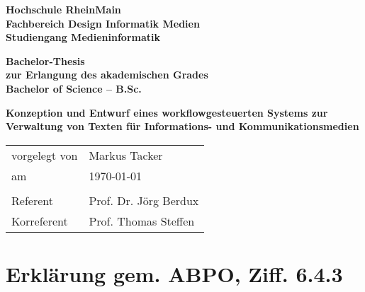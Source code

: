 \documentclass[11pt,a4paper]{article}
\begin{document}
\setmainfont[Mapping=tex-text]{ITC Stone Sans Std}


\setlength\fboxsep{0pt}
\setlength\fboxrule{0.5pt}




\begin{center}

\begin{small}

\textbf{Hochschule RheinMain\\Fachbereich Design Informatik Medien\\Studiengang Medieninformatik}

\vspace{1cm}

\textbf{Bachelor-Thesis\\zur Erlangung des akademischen Grades\\Bachelor of Science – B.Sc.}

\end{small}

\vspace{2cm}

\begin{huge}

\textbf{Konzeption und Entwurf eines workflowgesteuerten Systems zur Verwaltung von Texten für Informations- und Kommunikationsmedien}

\end{huge}

\end{center}

\setmainfont[Mapping=tex-text,BoldFont={Vollkorn-Bold},ItalicFont={Vollkorn-Italic},BoldItalicFont={Vollkorn-Bold Italic}]{Vollkorn}
\setsansfont[Mapping=tex-text]{ITC Stone Sans Std}

\vspace{8cm}

\begin{tabular}{@{}l l}
vorgelegt von & Markus Tacker\\
am & \today\\
& \\
Referent & Prof. Dr. Jörg Berdux\\
Korreferent & Prof. Thomas Steffen
\end{tabular}

\pagebreak

\section*{Erklärung gem. ABPO, Ziff. 6.4.3}
\end{document}
